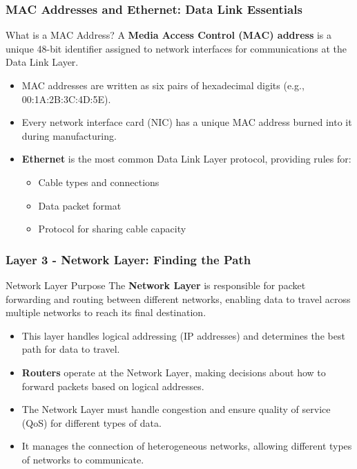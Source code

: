 \documentclass{beamer}
\begin{document}
\begin{frame}
    \frametitle{MAC Addresses and Ethernet: Data Link Essentials}
    
    \begin{alertblock}{What is a MAC Address?}
        A \textbf{Media Access Control (MAC) address} is a unique 48-bit identifier assigned to network interfaces for communications at the Data Link Layer.
    \end{alertblock}
    
    \begin{itemize}
        \item MAC addresses are written as six pairs of hexadecimal digits (e.g., 00:1A:2B:3C:4D:5E).
        
        \item Every network interface card (NIC) has a unique MAC address burned into it during manufacturing.
        
        \item \textbf{Ethernet} is the most common Data Link Layer protocol, providing rules for:
        \begin{itemize}
            \item Cable types and connections
            \item Data packet format
            \item Protocol for sharing cable capacity
        \end{itemize}
    \end{itemize}
\end{frame}

\begin{frame}
    \frametitle{Layer 3 - Network Layer: Finding the Path}
    
    \begin{alertblock}{Network Layer Purpose}
        The \textbf{Network Layer} is responsible for packet forwarding and routing between different networks, enabling data to travel across multiple networks to reach its final destination.
    \end{alertblock}
    
    \begin{itemize}
        \item This layer handles logical addressing (IP addresses) and determines the best path for data to travel.
        
        \item \textbf{Routers} operate at the Network Layer, making decisions about how to forward packets based on logical addresses.
        
        \item The Network Layer must handle congestion and ensure quality of service (QoS) for different types of data.
        
        \item It manages the connection of heterogeneous networks, allowing different types of networks to communicate.
    \end{itemize}
\end{frame}
\end{document}
